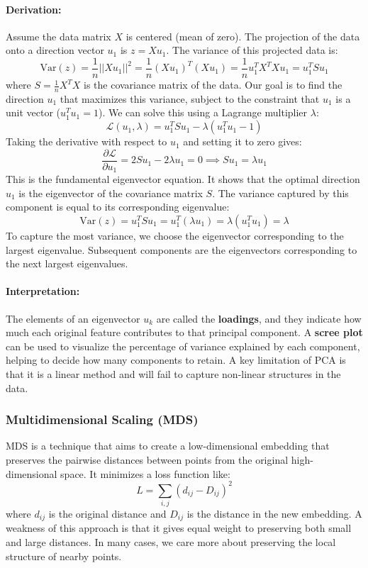 \documentclass{article}
\begin{document}
\begin{multicols}{2}
	\paragraph{Derivation:}
	Assume the data matrix $X$ is centered (mean of zero). The projection of the data onto a direction vector $u_1$ is $z = Xu_1$. The variance of this projected data is:
	$$ \text{Var}(z) = \frac{1}{n}||Xu_1||^2 = \frac{1}{n} (Xu_1)^T (Xu_1) = \frac{1}{n} u_1^T X^T X u_1 = u_1^T S u_1 $$
	where $S = \frac{1}{n}X^T X$ is the covariance matrix of the data. Our goal is to find the direction $u_1$ that maximizes this variance, subject to the constraint that $u_1$ is a unit vector ($u_1^T u_1 = 1$). We can solve this using a Lagrange multiplier $\lambda$:
	$$ \mathcal{L}(u_1, \lambda) = u_1^T S u_1 - \lambda(u_1^T u_1 - 1) $$
	Taking the derivative with respect to $u_1$ and setting it to zero gives:
	$$ \frac{\partial \mathcal{L}}{\partial u_1} = 2Su_1 - 2\lambda u_1 = 0 \implies Su_1 = \lambda u_1 $$
	This is the fundamental eigenvector equation. It shows that the optimal direction $u_1$ is the eigenvector of the covariance matrix $S$. The variance captured by this component is equal to its corresponding eigenvalue:
	$$ \text{Var}(z) = u_1^T S u_1 = u_1^T (\lambda u_1) = \lambda (u_1^T u_1) = \lambda $$
	To capture the most variance, we choose the eigenvector corresponding to the largest eigenvalue. Subsequent components are the eigenvectors corresponding to the next largest eigenvalues.

	\paragraph{Interpretation:} The elements of an eigenvector $u_k$ are called the \textbf{loadings}, and they indicate how much each original feature contributes to that principal component. A \textbf{scree plot} can be used to visualize the percentage of variance explained by each component, helping to decide how many components to retain. A key limitation of PCA is that it is a linear method and will fail to capture non-linear structures in the data.

	\subsubsection{Multidimensional Scaling (MDS)}
	MDS is a technique that aims to create a low-dimensional embedding that preserves the pairwise distances between points from the original high-dimensional space. It minimizes a loss function like:
	$$ L = \sum_{i,j} (d_{ij} - D_{ij})^2 $$
	where $d_{ij}$ is the original distance and $D_{ij}$ is the distance in the new embedding. A weakness of this approach is that it gives equal weight to preserving both small and large distances. In many cases, we care more about preserving the local structure of nearby points.


\end{multicols}
\end{document}
